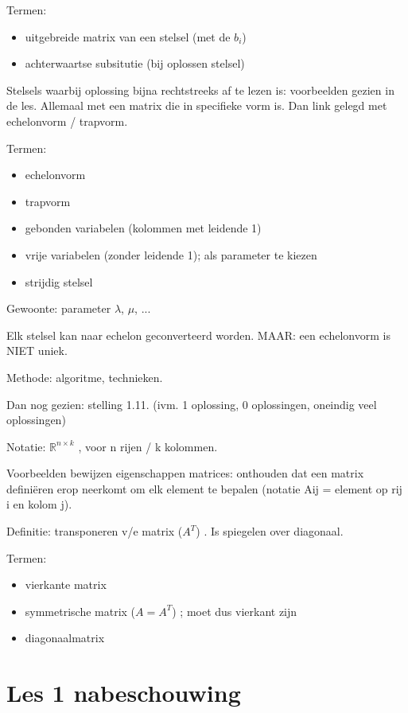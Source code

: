 \documentclass{article}
\begin{document}
Termen: 
\begin{itemize}
\item uitgebreide matrix van een stelsel (met de $b_i$) 
\item achterwaartse subsitutie (bij oplossen stelsel) 
\end{itemize}

Stelsels waarbij oplossing bijna rechtstreeks af te lezen is:  voorbeelden gezien in de les. Allemaal met een matrix die in specifieke vorm is. Dan link gelegd met echelonvorm / trapvorm. 

Termen:
\begin{itemize}
\item echelonvorm
\item trapvorm
\item gebonden variabelen (kolommen met leidende 1) 
\item vrije variabelen (zonder leidende 1); als parameter te kiezen
\item strijdig stelsel
\end{itemize}

Gewoonte: parameter $\lambda$, $\mu$, ...

Elk stelsel kan naar echelon geconverteerd worden. MAAR: een echelonvorm is NIET uniek. 

Methode: algoritme, technieken. 

Dan nog gezien: stelling 1.11. (ivm. 1 oplossing, 0 oplossingen, oneindig veel oplossingen)

Notatie: $\mathbb{R}^{n\times k}$ , voor n rijen / k kolommen. 

Voorbeelden bewijzen eigenschappen matrices: onthouden dat een matrix defini{\"e}ren erop neerkomt om elk element te bepalen (notatie Aij = element op rij i en kolom j). 

Definitie: transponeren v/e matrix ($A^T$) . Is spiegelen over diagonaal. 

Termen:
\begin{itemize}
\item vierkante matrix
\item symmetrische matrix ($A = A^T$) ; moet dus vierkant zijn
\item diagonaalmatrix
\end{itemize}

\section{Les 1 nabeschouwing}
\end{document}

